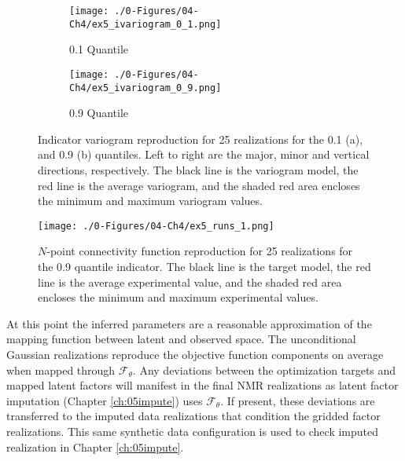\begin{figure}
    \begin{subfigure}{1.0\textwidth}
        \centering
        \texttt{[image: ./0-Figures/04-Ch4/ex5\_ivariogram\_0\_1.png]}
        \caption{0.1 Quantile}
    \end{subfigure}
    \begin{subfigure}{1.0\textwidth}
        \centering
        \texttt{[image: ./0-Figures/04-Ch4/ex5\_ivariogram\_0\_9.png]}
        \caption{0.9 Quantile}
    \end{subfigure}
    \caption{Indicator variogram reproduction for 25 realizations for the 0.1 (a), and 0.9 (b) quantiles. Left to right are the major, minor and vertical directions, respectively. The black line is the variogram model, the red line is the average variogram, and the shaded red area encloses the minimum and maximum variogram values.}
    \label{fig:ex5_ivariogram}
\end{figure}


\begin{figure}[htb!]
    \centering
    \texttt{[image: ./0-Figures/04-Ch4/ex5\_runs\_1.png]}
    \caption{$N$-point connectivity function reproduction for 25 realizations for the 0.9 quantile indicator. The black line is the target model, the red line is the average experimental value, and the shaded red area encloses the minimum and maximum experimental values.}
    \label{fig:ex5_runs_1}
\end{figure}

At this point the inferred parameters are a reasonable approximation of the mapping function between latent and observed space. The unconditional Gaussian realizations reproduce the objective function components on average when mapped through $\mathcal{F}_{\theta}$. Any deviations between the optimization targets and mapped latent factors will manifest in the final \gls{NMR} realizations as latent factor imputation (Chapter \ref{ch:05impute}) uses $\mathcal{F}_{\theta}$. If present, these deviations are transferred to the imputed data realizations that condition the gridded factor realizations. This same synthetic data configuration is used to check imputed realization in Chapter \ref{ch:05impute}.




